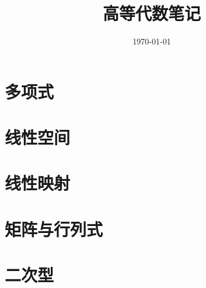 \documentclass[UTF8,12pt,a4paper,fontset=fandol]{ctexbook}
\title{高等代数笔记}
\author{}
\date{\today}
\begin{document}
\maketitle
\tableofcontents
\clearpage


\chapter{多项式}


\chapter{线性空间}


\chapter{线性映射}


\chapter{矩阵与行列式}


\chapter{二次型}
\end{document}
